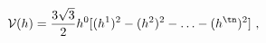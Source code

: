 \begin{equation}\label{genJorpol}
\mathcal{V}(h)= \frac{3\sqrt{3}}{2}h^0 [(h^1)^2-(h^{2})^2-\ldots
-(h^{\tn})^2 ] \ ,
\end{equation}

